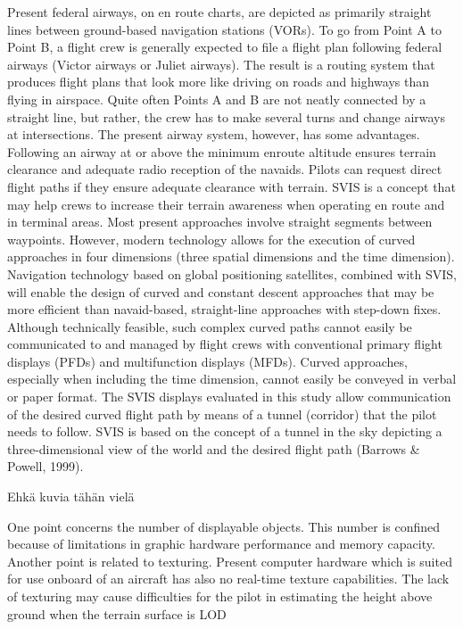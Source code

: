 \documentclass[utf8,bachelor,manualbib]{gradu3}
\begin{document}
Present federal airways, on en route charts, are depicted as primarily straight
lines between ground-based navigation stations (VORs). To go from Point A to
Point B, a flight crew is generally expected to file a flight plan following federal
airways (Victor airways or Juliet airways). The result is a routing system that produces
flight plans that look more like driving on roads and highways than flying in
airspace. Quite often Points A and B are not neatly connected by a straight line, but
rather, the crew has to make several turns and change airways at intersections. The
present airway system, however, has some advantages. Following an airway at or
above the minimum enroute altitude ensures terrain clearance and adequate radio
reception of the navaids. Pilots can request direct flight paths if they ensure adequate
clearance with terrain. SVIS is a concept that may help crews to increase
their terrain awareness when operating en route and in terminal areas.
Most present approaches involve straight segments between waypoints. However,
modern technology allows for the execution of curved approaches in four dimensions
(three spatial dimensions and the time dimension). Navigation technology
based on global positioning satellites, combined with SVIS, will enable the
design of curved and constant descent approaches that may be more efficient than
navaid-based, straight-line approaches with step-down fixes. Although technically
feasible, such complex curved paths cannot easily be communicated to and
managed by flight crews with conventional primary flight displays (PFDs) and
multifunction displays (MFDs). Curved approaches, especially when including
the time dimension, cannot easily be conveyed in verbal or paper format.
The SVIS displays evaluated in this study allow communication of the desired
curved flight path by means of a tunnel (corridor) that the pilot needs to follow.
SVIS is based on the concept of a tunnel in the sky depicting a three-dimensional
view of the world and the desired flight path (Barrows \& Powell, 1999). \citep{schnell2004}

Ehkä kuvia tähän vielä \citep{schnell2004}


One point concerns the number of displayable objects. This
number is confined because of limitations in graphic hardware
performance and memory capacity. Another point is related to
texturing. Present computer hardware which is suited for use
onboard of an aircraft has also no real-time texture capabilities.
The lack of texturing may cause difficulties for the pilot in
estimating the height above ground when the terrain surface is
LOD \citep{mollersachs1994}
\end{document}
